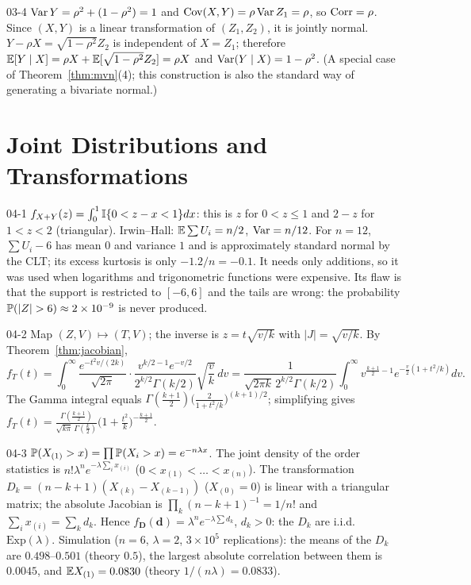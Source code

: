 \begin{solution}{03-4}
$\Var Y=\rho^2+(1-\rho^2)=1$ and $\Cov(X,Y)=\rho\Var Z_1=\rho$, so $\Corr=\rho$. Since $(X,Y)$ is a linear transformation of $(Z_1,Z_2)$, it is jointly normal. $Y-\rho X=\sqrt{1-\rho^2}Z_2$ is independent of $X=Z_1$; therefore $\E[Y\mid X]=\rho X+\E[\sqrt{1-\rho^2}Z_2]=\rho X$ and $\Var(Y\mid X)=1-\rho^2$. (A special case of Theorem~\ref{thm:mvn}(4); this construction is also the standard way of generating a bivariate normal.)
\end{solution}

\section{Joint Distributions and Transformations}

\begin{solution}{04-1}
$f_{X+Y}(z)=\int_0^1\I\{0<z-x<1\}dx$: this is $z$ for $0<z\le1$ and $2-z$ for $1<z<2$ (triangular). Irwin--Hall: $\E\sum U_i=n/2$, $\Var=n/12$. For $n=12$, $\sum U_i-6$ has mean $0$ and variance $1$ and is approximately standard normal by the CLT; its excess kurtosis is only $-1.2/n=-0.1$. It needs only additions, so it was used when logarithms and trigonometric functions were expensive. Its flaw is that the support is restricted to $[-6,6]$ and the tails are wrong: the probability $\P(|Z|>6)\approx2\times10^{-9}$ is never produced.
\end{solution}

\begin{solution}{04-2}
Map $(Z,V)\mapsto(T,V)$; the inverse is $z=t\sqrt{v/k}$ with $|J|=\sqrt{v/k}$. By Theorem~\ref{thm:jacobian},
\[
f_T(t)=\int_0^\infty\frac{e^{-t^2v/(2k)}}{\sqrt{2\pi}}\cdot\frac{v^{k/2-1}e^{-v/2}}{2^{k/2}\Gamma(k/2)}\sqrt{\frac vk}\,dv
=\frac{1}{\sqrt{2\pi k}\,2^{k/2}\Gamma(k/2)}\int_0^\infty v^{\frac{k+1}{2}-1}e^{-\frac v2(1+t^2/k)}dv .
\]
The Gamma integral equals $\Gamma(\frac{k+1}2)\big(\frac{2}{1+t^2/k}\big)^{(k+1)/2}$; simplifying gives
$f_T(t)=\frac{\Gamma(\frac{k+1}{2})}{\sqrt{k\pi}\,\Gamma(\frac k2)}\big(1+\frac{t^2}{k}\big)^{-\frac{k+1}{2}}$.
\end{solution}

\begin{solution}{04-3}
$\P(X_{(1)}>x)=\prod\P(X_i>x)=e^{-n\lambda x}$. The joint density of the order statistics is $n!\lambda^ne^{-\lambda\sum_ix_{(i)}}$ ($0<x_{(1)}<\dots<x_{(n)}$). The transformation $D_k=(n-k+1)(X_{(k)}-X_{(k-1)})$ ($X_{(0)}=0$) is linear with a triangular matrix; the absolute Jacobian is $\prod_k(n-k+1)^{-1}=1/n!$ and $\sum_ix_{(i)}=\sum_kd_k$. Hence $f_{\mathbf D}(\mathbf d)=\lambda^ne^{-\lambda\sum d_k}$, $d_k>0$: the $D_k$ are i.i.d.\ $\text{Exp}(\lambda)$.
Simulation ($n=6$, $\lambda=2$, $3\times10^5$ replications): the means of the $D_k$ are $0.498$--$0.501$ (theory $0.5$), the largest absolute correlation between them is $0.0045$, and $\E X_{(1)}=0.0830$ (theory $1/(n\lambda)=0.0833$).
\end{solution}

